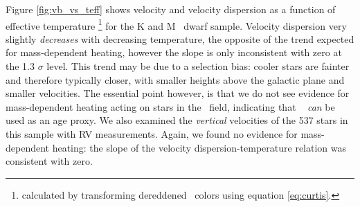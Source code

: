 Figure \ref{fig:vb_vs_teff} shows velocity and velocity dispersion as a
function of effective temperature \footnote{calculated by transforming
dereddened \gaia\ colors using equation \ref{eq:curtis}.} for the K and M
\kepler\ dwarf sample.
Velocity dispersion very slightly {\it decreases} with decreasing temperature,
the opposite of the trend expected for mass-dependent heating, however the
slope is only inconsistent with zero at the 1.3 $\sigma$ level.
This trend may be due to a selection bias: cooler stars are fainter and
therefore typically closer, with smaller heights above the galactic plane and
smaller velocities.
The essential point however, is that we do not see evidence for mass-dependent
heating acting on stars in the \kepler\ field, indicating that \sigmavb\ {\it
can} be used as an age proxy.
We also examined the {\it vertical} velocities of the 537 stars in this sample
with RV measurements.
Again, we found no evidence for mass-dependent heating: the slope of the
velocity dispersion-temperature relation was consistent with zero.


